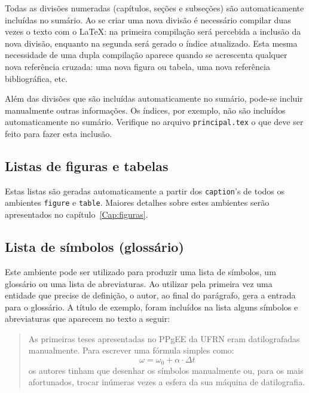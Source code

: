 Todas as divisões numeradas (capítulos, seções e subseções) são
automaticamente incluídas no sumário. Ao se criar uma nova divisão é
necessário compilar duas vezes o texto com o \LaTeX: na primeira
compilação será percebida a inclusão da nova divisão, enquanto na
segunda será gerado o índice atualizado. Esta mesma necessidade de uma
dupla compilação aparece quando se acrescenta qualquer nova referência
cruzada: uma nova figura ou tabela, uma nova referência bibliográfica,
etc.

Além das divisões que são incluídas automaticamente no sumário, pode-se
incluir manualmente outras informações. Os índices, por exemplo, não
são incluídos automaticamente no sumário. Verifique no arquivo
\texttt{principal.tex} o que deve ser feito para fazer esta inclusão.

\subsection{Listas de figuras e tabelas}
\label{Sec:listasfigtab}

Estas listas são geradas automaticamente a partir dos
\texttt{caption}'s de todos os ambientes \texttt{figure} e
\texttt{table}. Maiores detalhes sobre estes ambientes serão apresentados
no capítulo~\ref{Cap:figuras}.

\subsection{Lista de símbolos (glossário)}
\label{Sec:glossario}

Este ambiente pode ser utilizado para produzir uma lista de símbolos,
um glossário ou uma lista de abreviaturas. Ao utilizar pela primeira
vez uma entidade que precise de definição, o autor, ao final do
parágrafo, gera a entrada para o glossário. A título de exemplo,
foram incluídos na lista alguns símbolos e abreviaturas que aparecem
no texto a seguir:

\begin{quotation}
As primeiras teses apresentadas no PPgEE da UFRN eram datilografadas
manualmente. Para escrever uma fórmula simples como:%
%
%
\begin{equation}
\omega = \omega_0 + \alpha \cdot \Delta t
\label{Eq:glossario}
\end{equation}%
%
%
%
%
os autores tinham que desenhar os símbolos manualmente ou, para os
mais afortunados, trocar inúmeras vezes a esfera da sua máquina de
datilografia.
\end{quotation}

